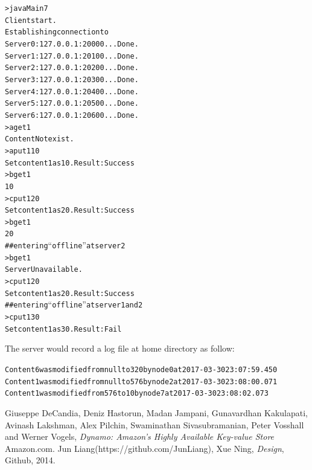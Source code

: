 \documentclass[11pt,letterpaper,en-US]{article}
\begin{document}
\begin{alltt}
> java Main 7
Client start.
Establishing connection to
    Server 0:127.0.0.1:20000... Done.
    Server 1:127.0.0.1:20100... Done.
    Server 2:127.0.0.1:20200... Done.
    Server 3:127.0.0.1:20300... Done.
    Server 4:127.0.0.1:20400... Done.
    Server 5:127.0.0.1:20500... Done.
    Server 6:127.0.0.1:20600... Done.
> a get 1
Content Not exist.
> a put 1 10
Set content 1 as 10 . Result: Success
> b get 1
10
> c put 1 20
Set content 1 as 20 . Result: Success
> b get 1
20
## entering ``offline'' at server 2
> b get 1
Server Unavailable.
> c put 1 20
Set content 1 as 20 . Result: Success
## entering ``offline'' at server 1 and 2
> c put 1 30
Set content 1 as 30 . Result: Fail
\end{alltt}

The server would record a log file at home directory as follow:
\begin{footnotesize}
\begin{alltt}
Content 6 was modified from null    to 320      by node 0   at 2017-03-30 23:07:59.450
Content 1 was modified from null    to 576      by node 2   at 2017-03-30 23:08:00.071
Content 1 was modified from 576     to 10       by node 7   at 2017-03-30 23:08:02.073
\end{alltt}
\end{footnotesize}

\pagebreak
\begin{thebibliography}{2}
  Giuseppe DeCandia, Deniz Hastorun, Madan Jampani, Gunavardhan Kakulapati, Avinash Lakshman, Alex Pilchin, Swaminathan Sivasubramanian, Peter Vosshall and Werner Vogels,
  \emph{Dynamo: Amazon’s Highly Available Key-value Store}
  Amazon.com.
  Jun Liang(https://github.com/JunLiang), Xue Ning,
  \emph{Design},
  Github, 2014.
\end{thebibliography}
\end{document}
